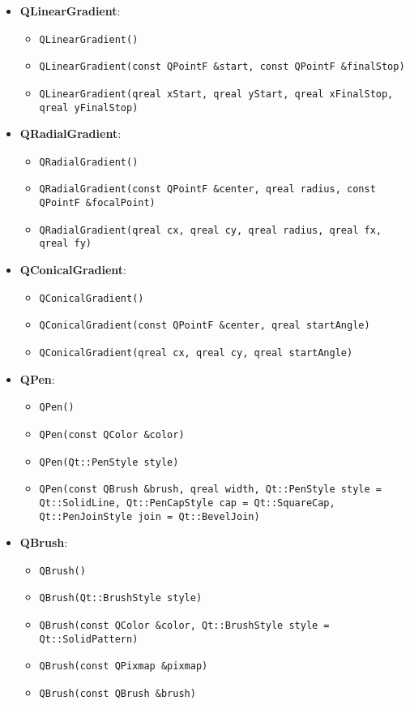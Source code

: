 \documentclass{report}
\begin{document}
\begin{itemize}
        \item \textbf{QLinearGradient}:
        \begin{itemize}
            \item \texttt{QLinearGradient()}
            \item \texttt{QLinearGradient(const QPointF \&start, const QPointF \&finalStop)}
            \item \texttt{QLinearGradient(qreal xStart, qreal yStart, qreal xFinalStop, qreal yFinalStop)}
        \end{itemize}

        \item \textbf{QRadialGradient}:
        \begin{itemize}
            \item \texttt{QRadialGradient()}
            \item \texttt{QRadialGradient(const QPointF \&center, qreal radius, const QPointF \&focalPoint)}
            \item \texttt{QRadialGradient(qreal cx, qreal cy, qreal radius, qreal fx, qreal fy)}
        \end{itemize}

        \item \textbf{QConicalGradient}:
        \begin{itemize}
            \item \texttt{QConicalGradient()}
            \item \texttt{QConicalGradient(const QPointF \&center, qreal startAngle)}
            \item \texttt{QConicalGradient(qreal cx, qreal cy, qreal startAngle)}
        \end{itemize}

        \item \textbf{QPen}:
        \begin{itemize}
            \item \texttt{QPen()}
            \item \texttt{QPen(const QColor \&color)}
            \item \texttt{QPen(Qt::PenStyle style)}
            \item \texttt{QPen(const QBrush \&brush, qreal width, Qt::PenStyle style = Qt::SolidLine, Qt::PenCapStyle cap = Qt::SquareCap, Qt::PenJoinStyle join = Qt::BevelJoin)}
        \end{itemize}

        \item \textbf{QBrush}:
        \begin{itemize}
            \item \texttt{QBrush()}
            \item \texttt{QBrush(Qt::BrushStyle style)}
            \item \texttt{QBrush(const QColor \&color, Qt::BrushStyle style = Qt::SolidPattern)}
            \item \texttt{QBrush(const QPixmap \&pixmap)}
            \item \texttt{QBrush(const QBrush \&brush)}
        \end{itemize}


\end{itemize}
\end{document}
